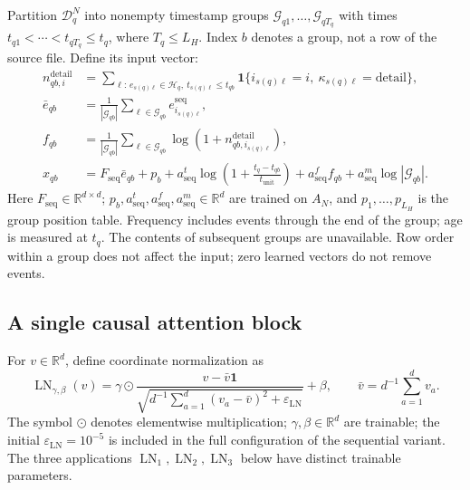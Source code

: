 \documentclass[12pt,a4paper]{article}
\newcommand{\R}{\mathbb R}
\newcommand{\ind}{\mathbf 1}
\newcommand{\eps}{\varepsilon}
\theoremstyle{plainru}
\begin{document}
Partition $\mathcal D_q^N$ into nonempty timestamp groups
$\mathcal G_{q1},\ldots,\mathcal G_{qT_q}$ with times
$t_{q1}<\cdots<t_{qT_q}\le t_q$, where $T_q\le L_H$.
Index $b$ denotes a group, not a row of the source file.
Define its input vector:
\begin{align}\label{eq:sequence-token}
n_{qb,i}^{\mathrm{detail}}
&=\sum_{\ell:\,e_{s(q)\ell}\in\mathcal H_q,\ t_{s(q)\ell}\le t_{qb}}
\ind\{i_{s(q)\ell}=i,\ \kappa_{s(q)\ell}=\mathrm{detail}\},\\
\bar e_{qb}&=\frac1{|\mathcal G_{qb}|}
\sum_{\ell\in\mathcal G_{qb}}e_{i_{s(q)\ell}}^{\mathrm{seq}},\nonumber\\
f_{qb}&=\frac1{|\mathcal G_{qb}|}
\sum_{\ell\in\mathcal G_{qb}}
\log(1+n_{qb,i_{s(q)\ell}}^{\mathrm{detail}}),\nonumber\\
x_{qb}&=F_{\mathrm{seq}}\bar e_{qb}+p_b
+a_{\mathrm{seq}}^t
\log\!\left(1+\frac{t_q-t_{qb}}{t_{\mathrm{unit}}}\right)
+a_{\mathrm{seq}}^f f_{qb}
+a_{\mathrm{seq}}^m\log|\mathcal G_{qb}|.\nonumber
\end{align}
Here $F_{\mathrm{seq}}\in\R^{d\times d}$;
$p_b,a_{\mathrm{seq}}^t,a_{\mathrm{seq}}^f,a_{\mathrm{seq}}^m\in\R^d$
are trained on $A_N$, and $p_1,\ldots,p_{L_H}$ is the group position table.
Frequency includes events through the end of the group; age is measured at $t_q$.
The contents of subsequent groups are unavailable. Row order within a group
does not affect the input; zero learned vectors do not remove events.

\subsection{A single causal attention block}
\label{sec:sequence-attention}

For $v\in\R^d$, define coordinate normalization as
\begin{equation}\label{eq:sequence-layernorm}
\operatorname{LN}_{\gamma,\beta}(v)
=\gamma\odot
\frac{v-\bar v\boldsymbol 1}
{\sqrt{d^{-1}\sum_{a=1}^d(v_a-\bar v)^2+\eps_{\mathrm{LN}}}}
+\beta,\qquad
\bar v=d^{-1}\sum_{a=1}^dv_a.
\end{equation}
The symbol $\odot$ denotes elementwise multiplication;
$\gamma,\beta\in\R^d$ are trainable; the initial $\eps_{\mathrm{LN}}=10^{-5}$
is included in the full configuration of the sequential variant.
The three applications $\operatorname{LN}_1,\operatorname{LN}_2,
\operatorname{LN}_3$ below have distinct trainable parameters.
\end{document}
